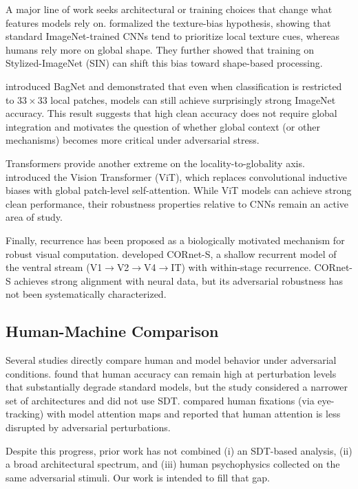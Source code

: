 \documentclass[12pt,a4paper]{article}
\begin{document}
A major line of work seeks architectural or training choices that change
what features models rely on. \citet{geirhos2019imagenet} formalized the
texture-bias hypothesis, showing that standard ImageNet-trained CNNs tend
to prioritize local texture cues, whereas humans rely more on global shape.
They further showed that training on Stylized-ImageNet (SIN) can shift this
bias toward shape-based processing.

\citet{brendel2019approximating} introduced BagNet and demonstrated that even
when classification is restricted to $33{\times}33$ local patches, models can
still achieve surprisingly strong ImageNet accuracy. This result suggests that
high clean accuracy does not require global integration and motivates the
question of whether global context (or other mechanisms) becomes more critical
under adversarial stress.

Transformers provide another extreme on the locality-to-globality axis.
\citet{dosovitskiy2020image} introduced the Vision Transformer (ViT), which
replaces convolutional inductive biases with global patch-level self-attention.
While ViT models can achieve strong clean performance, their robustness
properties relative to CNNs remain an active area of study.

Finally, recurrence has been proposed as a biologically motivated mechanism for
robust visual computation. \citet{kubilius2019brain} developed CORnet-S, a
shallow recurrent model of the ventral stream (V1$\to$V2$\to$V4$\to$IT) with
within-stage recurrence. CORnet-S achieves strong alignment with neural data,
but its adversarial robustness has not been systematically characterized.

\subsection{Human-Machine Comparison}

Several studies directly compare human and model behavior under adversarial
conditions. \citet{elsayed2018adversarial} found that human accuracy can remain
high at perturbation levels that substantially degrade standard models, but the
study considered a narrower set of architectures and did not use SDT.
\citet{zhou2020hiring} compared human fixations (via eye-tracking) with model
attention maps and reported that human attention is less disrupted by adversarial
perturbations.

Despite this progress, prior work has not combined (i) an SDT-based analysis,
(ii) a broad architectural spectrum, and (iii) human psychophysics collected on
the same adversarial stimuli. Our work is intended to fill that gap.
\end{document}
